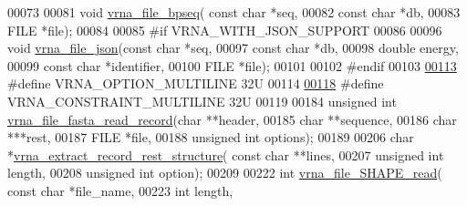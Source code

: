 \begin{DoxyCode}
00073 
00081 \textcolor{keywordtype}{void} \mbox{\hyperlink{group__file__utils_ga9b462e6f202594af5d3fa56e280d633f}{vrna\_file\_bpseq}}( \textcolor{keyword}{const} \textcolor{keywordtype}{char} *seq,
00082                       \textcolor{keyword}{const} \textcolor{keywordtype}{char} *db,
00083                       FILE *file);
00084 
00085 \textcolor{preprocessor}{#if VRNA\_WITH\_JSON\_SUPPORT}
00086 
00096 \textcolor{keywordtype}{void} \mbox{\hyperlink{group__file__utils_ga31f4a6c2ea1495a6e4f9eb45a9f6193d}{vrna\_file\_json}}(\textcolor{keyword}{const} \textcolor{keywordtype}{char} *seq,
00097                     \textcolor{keyword}{const} \textcolor{keywordtype}{char} *db,
00098                     \textcolor{keywordtype}{double} energy,
00099                     \textcolor{keyword}{const} \textcolor{keywordtype}{char} *identifier,
00100                     FILE *file);
00101 
00102 \textcolor{preprocessor}{#endif}
00103 
\mbox{\hyperlink{group__file__utils_gabec89c09874528c6cb73140a4c3d86d7}{00113}} \textcolor{preprocessor}{#define VRNA\_OPTION\_MULTILINE             32U}
00114 
\mbox{\hyperlink{group__file__utils_ga7d725ef525b29891abef3f1ed42599a4}{00118}} \textcolor{preprocessor}{#define VRNA\_CONSTRAINT\_MULTILINE         32U}
00119 
00184 \textcolor{keywordtype}{unsigned} \textcolor{keywordtype}{int} \mbox{\hyperlink{group__file__utils_ga8cfb7e271efc9e1f34640acb85475639}{vrna\_file\_fasta\_read\_record}}(\textcolor{keywordtype}{char} **header,
00185                                     \textcolor{keywordtype}{char} **sequence,
00186                                     \textcolor{keywordtype}{char}  ***rest,
00187                                     FILE *file,
00188                                     \textcolor{keywordtype}{unsigned} \textcolor{keywordtype}{int} options);
00189 
00206 \textcolor{keywordtype}{char} *\mbox{\hyperlink{group__file__utils_gad37cbb63a05eed63ba25c91628409be0}{vrna\_extract\_record\_rest\_structure}}( \textcolor{keyword}{const} \textcolor{keywordtype}{char} **lines,
00207                                           \textcolor{keywordtype}{unsigned} \textcolor{keywordtype}{int} length,
00208                                           \textcolor{keywordtype}{unsigned} \textcolor{keywordtype}{int} option);
00209 
00222 \textcolor{keywordtype}{int} \mbox{\hyperlink{group__file__utils_ga646ebf45450a69a7f2533f9ecd283a32}{vrna\_file\_SHAPE\_read}}( \textcolor{keyword}{const} \textcolor{keywordtype}{char} *file\_name,
00223                           \textcolor{keywordtype}{int} length,

\end{DoxyCode}
